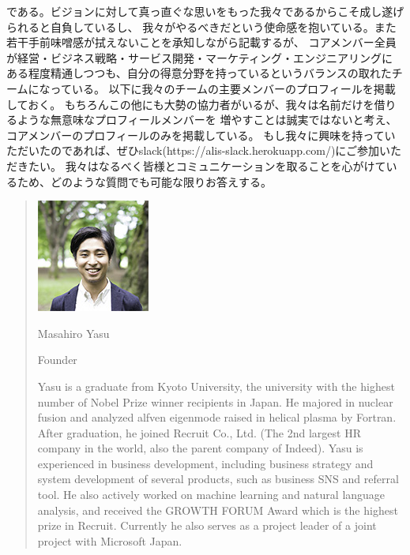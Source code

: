 \documentclass{jsarticle}
\begin{document}
である。ビジョンに対して真っ直ぐな思いをもった我々であるからこそ成し遂げられると自負しているし、
我々がやるべきだという使命感を抱いている。また若干手前味噌感が拭えないことを承知しながら記載するが、
コアメンバー全員が経営・ビジネス戦略・サービス開発・マーケティング・エンジニアリングに
ある程度精通しつつも、自分の得意分野を持っているというバランスの取れたチームになっている。
以下に我々のチームの主要メンバーのプロフィールを掲載しておく。
もちろんこの他にも大勢の協力者がいるが、我々は名前だけを借りるような無意味なプロフィールメンバーを
増やすことは誠実ではないと考え、コアメンバーのプロフィールのみを掲載している。
もし我々に興味を持っていただいたのであれば、ぜひslack(https://alis-slack.herokuapp.com/)にご参加いただきたい。
我々はなるべく皆様とコミュニケーションを取ることを心がけているため、どのような質問でも可能な限りお答えする。
\begin{quote}
	\includegraphics{img/yasu.jpg}
	
Masahiro Yasu

Founder

Yasu is a graduate from Kyoto University, the university with the highest
number of Nobel Prize winner recipients in Japan. He majored in nuclear fusion and 
analyzed alfven eigenmode raised in helical plasma by Fortran. After graduation, 
he joined Recruit Co., Ltd. (The 2nd largest HR company in the world, also 
the parent company of Indeed). Yasu is experienced in business development, 
including business strategy and system development of several products, 
such as business SNS and referral tool. He also actively worked on machine 
learning and natural language analysis, and received the GROWTH FORUM 
Award which is the highest prize in Recruit. Currently he also serves as a 
project leader of a joint project with Microsoft Japan.
\end{quote}
\end{document}
